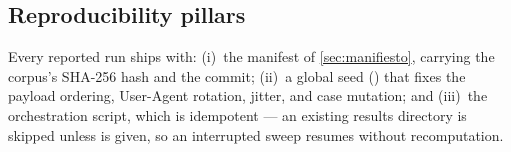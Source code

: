 \subsection{Reproducibility pillars}
\label{sec:reprod}

Every reported run ships with: (i)~the manifest of \cref{sec:manifiesto},
carrying the corpus's SHA-256 hash and the  commit; (ii)~a global
seed () that fixes the  payload ordering,
User-Agent rotation, jitter, and case mutation; and (iii)~the orchestration
script, which is idempotent --- an existing results directory is skipped
unless  is given, so an interrupted sweep resumes without
recomputation.
